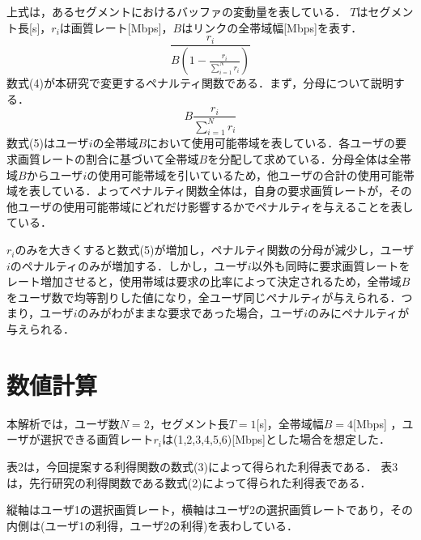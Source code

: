 \documentclass[rinkou,a4paper,uplatex]{ieicej}
\begin{document}
上式は，あるセグメントにおけるバッファの変動量を表している．
$T$はセグメント長[s]，$r_i$は画質レート[Mbps]，$B$はリンクの全帯域幅[Mbps]を表す．
\begin{equation}
    \frac{r_i}{B(1-\frac{r_i}{\sum^N_{i=1}r_i})}
\end{equation}
数式(4)が本研究で変更するペナルティ関数である．まず，分母について説明する．
\begin{equation}
   B\frac{r_i}{\sum^N_{i=1}r_i}
\end{equation}
数式(5)はユーザ$i$の全帯域$B$において使用可能帯域を表している．各ユーザの要求画質レートの割合に基づいて全帯域$B$を分配して求めている\cite{johari}．分母全体は全帯域$B$からユーザ$i$の使用可能帯域を引いているため，他ユーザの合計の使用可能帯域を表している．よってペナルティ関数全体は，自身の要求画質レートが，その他ユーザの使用可能帯域にどれだけ影響するかでペナルティを与えることを表している．

$r_i$のみを大きくすると数式(5)が増加し，ペナルティ関数の分母が減少し，ユーザ$i$のペナルティのみが増加する．しかし，ユーザ$i$以外も同時に要求画質レートをレート増加させると，使用帯域は要求の比率によって決定されるため，全帯域$B$をユーザ数で均等割りした値になり，全ユーザ同じペナルティが与えられる．つまり，ユーザ$i$のみがわがままな要求であった場合，ユーザ$i$のみにペナルティが与えられる．

\section{数値計算}
本解析では，ユーザ数$N=2$，セグメント長$T=1$[s]，全帯域幅$B = 4$[Mbps] ，ユーザが選択できる画質レート$r_i$は(1,2,3,4,5,6)[Mbps]とした場合を想定した．

表2は，今回提案する利得関数の数式(3)によって得られた利得表である．
表3は，先行研究の利得関数である数式(2)によって得られた利得表である．

縦軸はユーザ1の選択画質レート，横軸はユーザ2の選択画質レートであり，その内側は(ユーザ1の利得，ユーザ2の利得)を表わしている．
\end{document}
